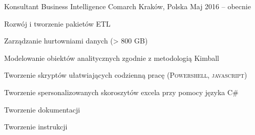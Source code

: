 

\begin{cventries}
  \cventry
    {Konsultant Business Intelligence} 
    {Comarch} 
    {Kraków, Polska} 
    {Maj 2016 -- obecnie} 
    {\begin{cvitems} 
		\item {Rozwój i tworzenie pakietów ETL}
        \item {Zarządzanie hurtowniami danych (> 800 GB)}
        \item {Modelowanie obiektów analitycznych zgodnie z metodologią Kimball}
		\item {Tworzenie skryptów ułatwiających codzienną pracę (\textsc{Powershell}, \textsc{javascript})}
		\item {Tworzenie spersonalizowanych skoroszytów excela przy pomocy języka C\#}
        \item {Tworzenie dokumentacji}
        \item {Tworzenie instrukcji}
    \end{cvitems}}


\end{cventries}
